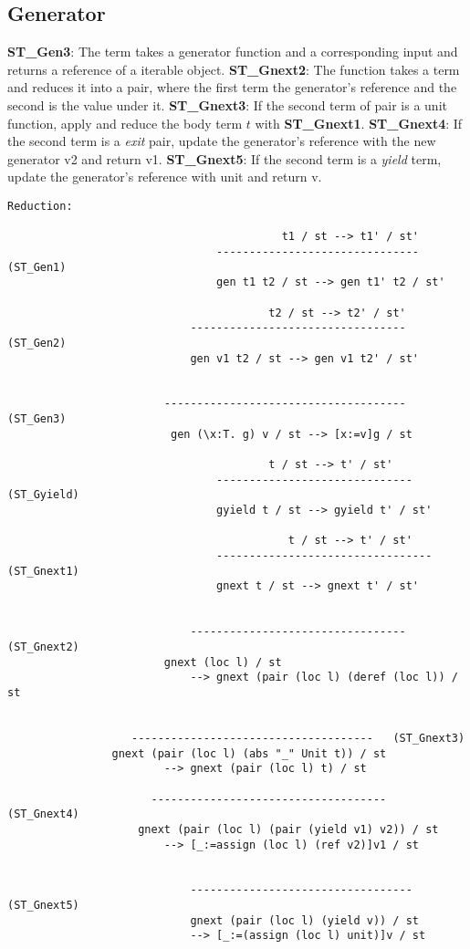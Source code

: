 \subsection{Generator}
\textbf{ST_Gen3}: The \gen term takes a generator function and a corresponding input and returns a reference of a iterable object.
\textbf{ST_Gnext2}: The \nt function takes a \gen term and reduces it into a pair, where the first term the generator's reference and the second is the value under it.
\textbf{ST_Gnext3}: If the second term of pair is a unit function, apply and reduce the body term $t$ with \textbf{ST_Gnext1}.
\textbf{ST_Gnext4}: If the second term is a \textit{exit} pair, update the generator's reference with the new generator v2 and return v1.
\textbf{ST_Gnext5}: If the second term is a \textit{yield} term, update the generator's reference with unit and return v.
\begin{lstlisting}
Reduction:

										  t1 / st --> t1' / st'
								-------------------------------   (ST_Gen1)
								gen t1 t2 / st --> gen t1' t2 / st'

										t2 / st --> t2' / st'
							---------------------------------   (ST_Gen2)
							gen v1 t2 / st --> gen v1 t2' / st'
							  
							  
						------------------------------------- (ST_Gen3)
						 gen (\x:T. g) v / st --> [x:=v]g / st
													
									    t / st --> t' / st'
								------------------------------   (ST_Gyield)
								gyield t / st --> gyield t' / st'
													
										   t / st --> t' / st'
								---------------------------------  (ST_Gnext1)
								gnext t / st --> gnext t' / st'
								

							---------------------------------   (ST_Gnext2)
						gnext (loc l) / st 
							--> gnext (pair (loc l) (deref (loc l)) / st
								
						
				   -------------------------------------   (ST_Gnext3)
				gnext (pair (loc l) (abs "_" Unit t)) / st
						--> gnext (pair (loc l) t) / st
								
					  ------------------------------------    (ST_Gnext4)
					gnext (pair (loc l) (pair (yield v1) v2)) / st
						--> [_:=assign (loc l) (ref v2)]v1 / st
								
								
							----------------------------------   (ST_Gnext5)
							gnext (pair (loc l) (yield v)) / st
							--> [_:=(assign (loc l) unit)]v / st
												
\end{lstlisting}

